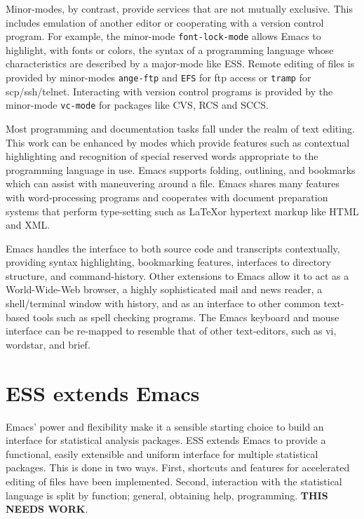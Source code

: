 \documentclass{article}
\newcommand{\stexttt}[1]{{\small\texttt{#1}}}
\begin{document}
Minor-modes, by contrast, provide
services that are not mutually exclusive.  This includes emulation of
another editor or cooperating with a version control program.  For
example, the minor-mode \stexttt{font-lock-mode} allows Emacs to highlight, with
fonts or colors, the syntax of a programming language whose
characteristics are described by a major-mode like ESS. 
Remote editing of files is provided by minor-modes \stexttt{ange-ftp} and 
\stexttt{EFS} for ftp access or \stexttt{tramp} for scp/ssh/telnet.
Interacting with version control programs is provided by the minor-mode
\stexttt{vc-mode} for packages like CVS, RCS and SCCS. 

Most programming and documentation tasks fall under the realm of text
editing.  This work can be enhanced by modes which provide features such 
as contextual highlighting and recognition of special reserved words 
appropriate to the programming language in use.  Emacs supports
folding, outlining, and bookmarks which can assist with maneuvering
around a file.  Emacs shares many features with word-processing
programs and cooperates with document preparation systems
that perform type-setting such as \LaTeX or hypertext markup
like HTML and XML.


 Emacs handles the
interface to both source code and transcripts contextually, providing
syntax highlighting, bookmarking features, interfaces to directory
structure, and command-history.  Other extensions to Emacs allow it to
act as a World-Wide-Web browser, a highly sophisticated mail and news
reader, a shell/terminal window with history, and as an interface to
other common text-based tools such as spell checking programs.  The
Emacs keyboard and mouse interface can be re-mapped to resemble that
of other text-editors, such as vi, wordstar, and brief.


\section{ESS extends Emacs}
\label{sec:ess-extends-emacs}

Emacs' power and flexibility make it a sensible starting choice to
build an interface for statistical analysis packages.  ESS extends
Emacs to provide a functional, easily extensible and uniform interface
for multiple statistical packages.  This is done in two ways.  First,
shortcuts and features for accelerated editing of files have been
implemented.  Second, interaction with the statistical
language is split by function; general, obtaining help, programming.
\textbf{THIS NEEDS WORK}.
\end{document}
